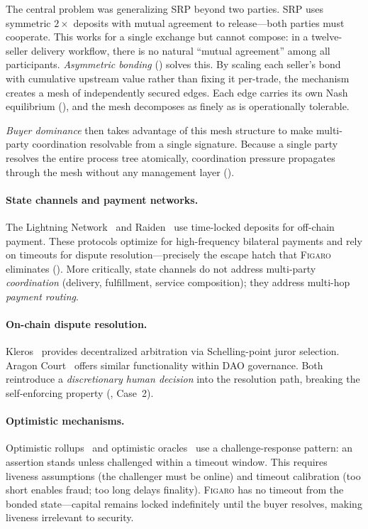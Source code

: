 \documentclass[11pt,a4paper]{article}
\theoremstyle{definition}
\theoremstyle{remark}
\newcommand{\figaro}{\textsc{Figaro}}
\begin{document}
The central problem was generalizing SRP beyond two parties. SRP uses
symmetric $2\times$ deposits with mutual agreement to release---both
parties must cooperate. This works for a single exchange but cannot
compose: in a twelve-seller delivery workflow, there is no natural
``mutual agreement'' among all participants. \emph{Asymmetric bonding}
() solves this. By scaling each seller's
bond with cumulative upstream value rather than fixing it per-trade,
the mechanism creates a mesh of independently secured edges. Each edge
carries its own Nash equilibrium (), and the
mesh decomposes as finely as is operationally tolerable.

\emph{Buyer dominance} then takes advantage of this mesh structure to
make multi-party coordination resolvable from a single signature.
Because a single party resolves the entire process tree atomically,
coordination pressure propagates through the mesh without any
management layer ().

\paragraph{State channels and payment networks.}
The Lightning Network~\citep{poon2016} and Raiden~\citep{raiden2017}
use time-locked deposits for off-chain payment. These protocols
optimize for high-frequency bilateral payments and rely on timeouts
for dispute resolution---precisely the escape hatch that \figaro{}
eliminates (). More critically, state
channels do not address multi-party \emph{coordination} (delivery,
fulfillment, service composition); they address multi-hop
\emph{payment routing}.

\paragraph{On-chain dispute resolution.}
Kleros~\citep{kleros2019} provides decentralized arbitration via
Schelling-point juror selection. Aragon Court~\citep{aragon2017}
offers similar functionality within DAO governance. Both reintroduce
a \emph{discretionary human decision} into the resolution path,
breaking the self-enforcing property
(, Case~2).

\paragraph{Optimistic mechanisms.}
Optimistic rollups~\citep{optimism2021} and optimistic
oracles~\citep{uma2020} use a challenge-response pattern: an assertion
stands unless challenged within a timeout window. This requires
liveness assumptions (the challenger must be online) and timeout
calibration (too short enables fraud; too long delays finality).
\figaro{} has no timeout from the bonded state---capital remains
locked indefinitely until the buyer resolves, making liveness
irrelevant to security.
\end{document}
